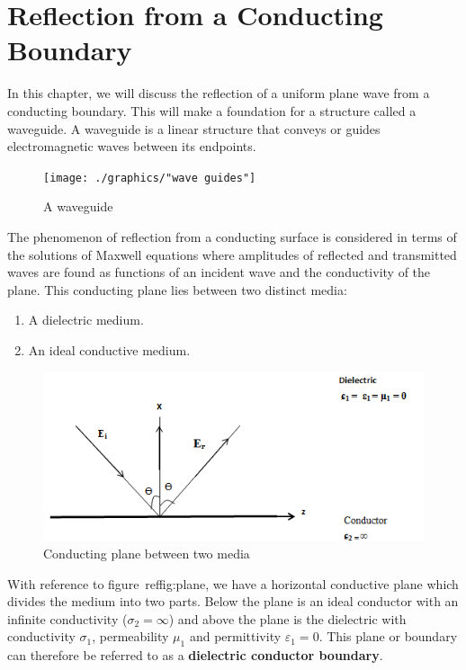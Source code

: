 \chapter{Reflection from a Conducting Boundary}
In this chapter, we will discuss the reflection of a uniform plane wave from a conducting boundary. This will make a foundation for a structure called a waveguide. A waveguide is a linear structure that conveys or guides electromagnetic waves between its endpoints.
\begin{figure}[h]
\centering
\texttt{[image: ./graphics/"wave guides"]}
\caption{A waveguide}
\end{figure}
The phenomenon of reflection from a conducting surface is considered in terms of the solutions of Maxwell equations where amplitudes of reflected and transmitted waves are found as functions of an incident wave and the conductivity of the plane. This conducting plane lies between two distinct media: 
\begin{enumerate}
\item A dielectric medium.
\item An ideal conductive medium.
\end{enumerate}
\begin{figure}[h]
\centering
\includegraphics[width=1\linewidth]{./graphics/plane}
\caption{Conducting plane between two media}
\label{fig:plane}
\end{figure}
With reference to figure~ref{fig:plane}, we have a horizontal conductive plane which divides the medium into two parts. Below the plane is an ideal conductor with an infinite conductivity ($\sigma _2 =\infty$) and above the plane is the dielectric with conductivity $\sigma_1$, permeability $\mu _1$ and	permittivity $ \varepsilon _1 = 0 $. This plane or boundary can therefore be referred to as a \textbf{dielectric conductor boundary}.
 
